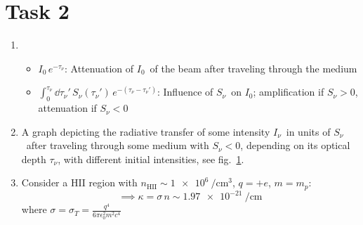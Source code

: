 \documentclass[11pt,a4paper]{scrartcl}
\newcommand*{\figref}[1]{see fig.~\ref{#1}}
\newcommand{\Inull}{\ensuremath{I_0}}
\newcommand{\Inu}{\ensuremath{I_{\nu}}}
\newcommand{\taunu}{\ensuremath{\tau_{\nu}}}
\newcommand{\source}{\ensuremath{S_{\nu}}}
\begin{document}
\section*{Task 2}

\begin{enumerate}[label=\textbf{\large(\alph*)}, itemsep=2\baselineskip]

\item
    \begin{itemize}
        \item $\Inull\,e^{-\taunu}$: Attenuation of \Inull~of the beam after traveling through the medium
        \item
            $\int_{0}^{\taunu}\dd\taunu'\,\source(\taunu')\,e^{-(\taunu-\taunu')}$:
            Influence of \source~on \Inull; amplification if $\source > 0$,
            attenuation if $\source < 0$
    \end{itemize}

\item
    A graph depicting the radiative transfer of some intensity \Inu~in units of
    \source~after traveling through some medium with $\source < 0$, depending
    on its optical depth \taunu, with different initial intensities,
    \figref{fig:fig1}.
    \begin{figure}[h]
        \centering
        
        \caption{}
        \label{fig:fig1}
    \end{figure}

\item
    Consider a HII region with
    $n_{\textrm{HII}}\sim\SI{1e6}{\per\centi\metre\cubed}$, $q=+e$, $m=m_p$:
    \begin{equation*}
        \implies\kappa = \sigma\,n \sim \SI{1.97e-21}{\per\centi\metre}
    \end{equation*}
    where $\sigma = \sigma_T = \frac{q^4}{6\pi\epsilon_0^2m^2c^4}$

\end{enumerate}
\end{document}
